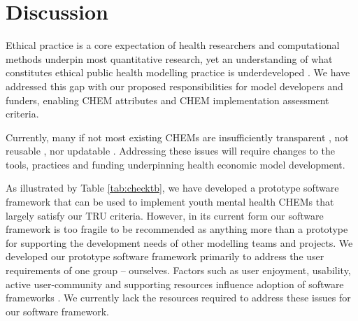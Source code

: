 \documentclass[sn-vancouver,Numbered,pdflatex]{sn-jnl}
\theoremstyle{remark}
\theoremstyle{definition}
\begin{document}
\begin{landscape}

\end{landscape}

\hypertarget{discussion}{%
\section{Discussion}\label{discussion}}

Ethical practice is a core expectation of health researchers and computational methods underpin most quantitative research, yet an understanding of what constitutes ethical public health modelling practice is underdeveloped \citep{10.3389/fpubh.2017.00068}. We have addressed this gap with our proposed responsibilities for model developers and funders, enabling CHEM attributes and CHEM implementation assessment criteria.

Currently, many if not most existing CHEMs are insufficiently transparent \citep{Jalali2021, McManus2019, Bermejo2017, Ghabri2019}, not reusable \citep{Feenstra2022, Emerson2019}, nor updatable \citep{Sampson2017, 10.3389/fpubh.2022.899874}. Addressing these issues will require changes to the tools, practices and funding underpinning health economic model development.

As illustrated by Table \ref{tab:checktb}, we have developed a prototype software framework that can be used to implement youth mental health CHEMs that largely satisfy our TRU criteria. However, in its current form our software framework is too fragile to be recommended as anything more than a prototype for supporting the development needs of other modelling teams and projects. We developed our prototype software framework primarily to address the user requirements of one group -- ourselves. Factors such as user enjoyment, usability, active user-community and supporting resources influence adoption of software frameworks \citep{myllarniemi2018development}. We currently lack the resources required to address these issues for our software framework.
\end{document}
